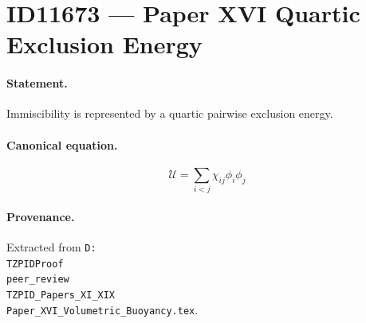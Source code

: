\section*{ID11673 --- Paper XVI Quartic Exclusion Energy}

\paragraph{Statement.}
Immiscibility is represented by a quartic pairwise exclusion energy.

\paragraph{Canonical equation.}
\[
\mathcal{U}=\sum_{i<j}\chi_{ij}\phi_i\phi_j
\]

\paragraph{Provenance.}
Extracted from \texttt{D:\\TZPIDProof\\peer\_review\\TZPID\_Papers\_XI\_XIX\\Paper\_XVI\_Volumetric\_Buoyancy.tex}.
